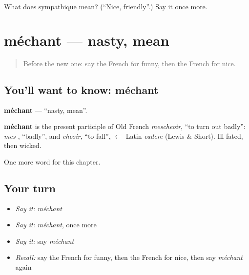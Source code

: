 \begin{tcolorbox}[breakable,colback=teal!4,colframe=teal!35!black,title={Before you move on}]
What does sympathique mean? (\textquotedblleft{}Nice, friendly\textquotedblright{}.) Say it once more.
\end{tcolorbox}
\section[méchant]{méchant — nasty, mean}

\label{lesson:FR-C133-mechant}



\begin{quote}
Before the new one: say the French for funny, then the French for nice.
\end{quote}

\subsection*{You'll want to know: méchant}
\textbf{méchant} — \textquotedblleft{}nasty, mean\textquotedblright{}.

\begin{cousinweb}
\textbf{méchant} is the present participle of Old French \emph{mescheoir}, \textquotedblleft{}to turn out badly\textquotedblright{}: \emph{mes-}, \textquotedblleft{}badly\textquotedblright{}, and \emph{cheoir}, \textquotedblleft{}to fall\textquotedblright{}, $\leftarrow$ Latin \emph{cadere} (Lewis \& Short). Ill-fated, then wicked.
\end{cousinweb}

\begin{grammarlens}[title={What you've built}]
One more word for this chapter.
\end{grammarlens}

\subsection*{Your turn}
\begin{itemize}
\raggedright
  \item \emph{Say it:} \emph{méchant}
  \item \emph{Say it:} \emph{méchant}, once more
  \item \emph{Say it:} say \emph{méchant}
  \item \emph{Recall:} say the French for funny, then the French for nice, then say \emph{méchant} again
\end{itemize}

